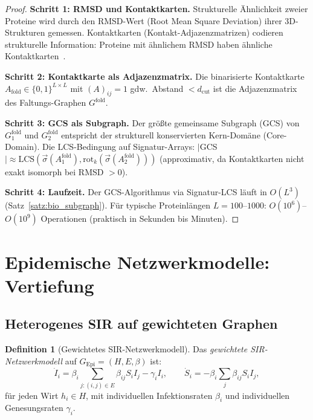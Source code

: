 ﻿\documentclass[a4paper,12pt]{article}
\theoremstyle{plain}
\theoremstyle{definition}
\newtheorem{definition}{Definition}
\theoremstyle{remark}
\newcommand{\Gepi}{G_{\mathrm{Epi}}}
\newcommand{\sigvec}{\vec{\sigma}}
\begin{document}
\begin{proof}
\textbf{Schritt 1: RMSD und Kontaktkarten.}
Strukturelle \"Ahnlichkeit zweier Proteine wird durch den RMSD-Wert
(Root Mean Square Deviation) ihrer 3D-Strukturen gemessen.
Kontaktkarten (Kontakt-Adjazenzmatrizen) codieren strukturelle Information:
Proteine mit \"ahnlichem RMSD haben \"ahnliche Kontaktkarten~\cite{holm1993}.

\textbf{Schritt 2: Kontaktkarte als Adjazenzmatrix.}
Die binarisierte Kontaktkarte $A_{\mathrm{fold}} \in \{0,1\}^{L\times L}$
mit $(A)_{ij} = 1$ gdw.\ Abstand $< d_{\mathrm{cut}}$ ist die
Adjazenzmatrix des Faltungs-Graphen $G^{\mathrm{fold}}$.

\textbf{Schritt 3: GCS als Subgraph.}
Der gr\"o{\ss}te gemeinsame Subgraph (GCS) von $G_1^{\mathrm{fold}}$ und $G_2^{\mathrm{fold}}$
entspricht der strukturell konservierten Kern-Dom\"ane (Core-Domain).
Die LCS-Bedingung auf Signatur-Arrays:
$|$GCS$| \approx \mathrm{LCS}(\sigvec(A_1^{\mathrm{fold}}),
\mathrm{rot}_k(\sigvec(A_2^{\mathrm{fold}})))$
(approximativ, da Kontaktkarten nicht exakt isomorph bei RMSD $> 0$).

\textbf{Schritt 4: Laufzeit.}
Der GCS-Algorithmus via Signatur-LCS l\"auft in $O(L^3)$ (Satz~\ref{satz:bio_subgraph}).
F\"ur typische Proteinl\"angen $L = 100$--$1000$: $O(10^6)$--$O(10^9)$
Operationen (praktisch in Sekunden bis Minuten).
\end{proof}

\section{Epidemische Netzwerkmodelle: Vertiefung}

\subsection{Heterogenes SIR auf gewichteten Graphen}

\begin{definition}[Gewichtetes SIR-Netzwerkmodell]
\label{def:sir_netz}
Das \emph{gewichtete SIR-Netzwerkmodell} auf $\Gepi = (H, E, \beta)$ ist:
\[
\dot{I}_i = \beta_i \sum_{j: (i,j)\in E} \beta_{ij} S_i I_j - \gamma_i I_i,
\qquad \dot{S}_i = -\beta_i \sum_j \beta_{ij} S_i I_j,
\]
f\"ur jeden Wirt $h_i \in H$, mit individuellen Infektionsraten
$\beta_i$ und individuellen Genesungsraten $\gamma_i$.
\end{definition}
\end{document}
